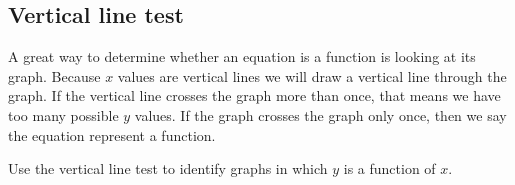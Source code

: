 \subsection{Vertical line test}
A great way to determine whether an equation is a function is looking at its graph. Because $x$ values are vertical lines we will draw a vertical line through the
graph. If the vertical line crosses the graph more than once, that means we have too many possible $y$ values. If the graph crosses the graph only once, then we say the equation represent a function.
\begin{exa}
    Use the vertical line test to identify  graphs in  which $y$ is a function of $x$.
\end{exa}
%
\begin{figure}[ht]
\centering
{} 
\end{figure}
%
